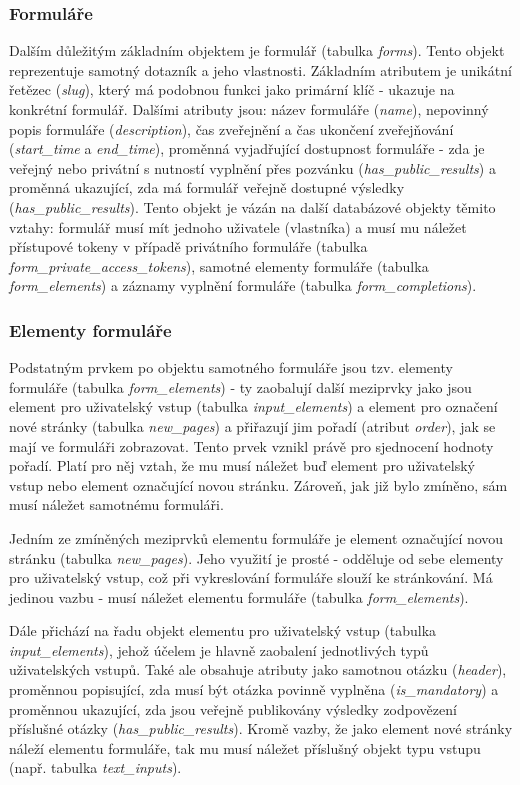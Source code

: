 	\subsubsection{Formuláře}
	Dalším důležitým základním objektem je formulář (tabulka \textit{forms}). Tento objekt reprezentuje samotný dotazník a jeho vlastnosti. Základním atributem je unikátní řetězec (\textit{slug}), který má podobnou funkci jako primární klíč - ukazuje na konkrétní formulář. Dalšími atributy jsou: název formuláře (\textit{name}), nepovinný popis formuláře (\textit{description}), čas zveřejnění a čas ukončení zveřejňování (\textit{start\_time} a \textit{end\_time}), proměnná vyjadřující dostupnost formuláře - zda je veřejný nebo privátní s nutností vyplnění přes pozvánku (\textit{has\_public\_results}) a proměnná ukazující, zda má formulář veřejně dostupné výsledky (\textit{has\_public\_results}). Tento objekt je vázán na další databázové objekty těmito vztahy: formulář musí mít jednoho uživatele (vlastníka) a musí mu náležet přístupové tokeny v případě privátního formuláře (tabulka \textit{form\_private\_access\_tokens}), samotné elementy formuláře (tabulka \textit{form\_elements}) a záznamy vyplnění formuláře (tabulka \textit{form\_completions}).
	
	\subsubsection{Elementy formuláře}
	Podstatným prvkem po objektu samotného formuláře jsou tzv. elementy formuláře (tabulka \textit{form\_elements}) - ty zaobalují další meziprvky jako jsou element pro uživatelský vstup (tabulka \textit{input\_elements}) a element pro označení nové stránky (tabulka \textit{new\_pages}) a přiřazují jim pořadí (atribut \textit{order}), jak se mají ve formuláři zobrazovat. Tento prvek vznikl právě pro sjednocení hodnoty pořadí. Platí pro něj vztah, že mu musí náležet buď element pro uživatelský vstup nebo element označující novou stránku. Zároveň, jak již bylo zmíněno, sám musí náležet samotnému formuláři.
	
	Jedním ze zmíněných meziprvků elementu formuláře je element označující novou stránku (tabulka \textit{new\_pages}). Jeho využití je prosté - odděluje od sebe elementy pro uživatelský vstup, což při vykreslování formuláře slouží ke stránkování. Má jedinou vazbu - musí náležet elementu formuláře (tabulka \textit{form\_elements}).
	
	Dále přichází na řadu objekt elementu pro uživatelský vstup (tabulka \textit{input\_elements}), jehož účelem je hlavně zaobalení jednotlivých typů uživatelských vstupů. Také ale obsahuje atributy jako samotnou otázku (\textit{header}), proměnnou popisující, zda musí být otázka povinně vyplněna (\textit{is\_mandatory}) a proměnnou ukazující, zda jsou veřejně publikovány výsledky zodpovězení příslušné otázky (\textit{has\_public\_results}). Kromě vazby, že jako element nové stránky náleží elementu formuláře, tak mu musí náležet příslušný objekt typu vstupu (např. tabulka \textit{text\_inputs}).
	
